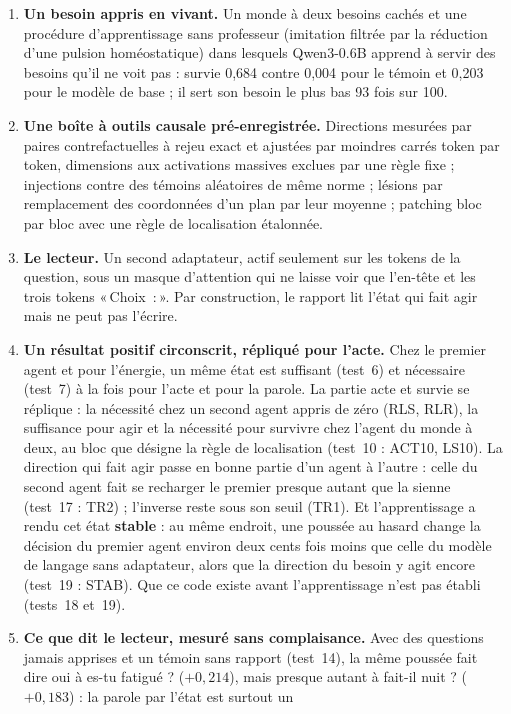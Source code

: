 \documentclass[11pt,a4paper]{article}
\newcommand{\Choix}{«\,Choix~:\,»}
\begin{document}
\begin{enumerate}
\item \textbf{Un besoin appris en vivant.} Un monde à deux besoins cachés et une
procédure d'apprentissage sans professeur (imitation filtrée par la réduction
d'une pulsion homéostatique) dans lesquels Qwen3-0.6B apprend à servir des besoins
qu'il ne voit pas : survie 0,684 contre 0,004 pour le témoin et 0,203 pour le
modèle de base ; il sert son besoin le plus bas 93 fois sur 100.
\item \textbf{Une boîte à outils causale pré-enregistrée.} Directions mesurées par
paires contrefactuelles à rejeu exact et ajustées par moindres carrés token par
token, dimensions aux activations massives exclues par une règle fixe ;
injections contre des témoins aléatoires de même norme ; lésions par
remplacement des coordonnées d'un plan par leur moyenne ; patching bloc par bloc
avec une règle de localisation étalonnée.
\item \textbf{Le lecteur.} Un second adaptateur, actif seulement sur les tokens de
la question, sous un masque d'attention qui ne laisse voir que l'en-tête et les
trois tokens \Choix{}. Par construction, le rapport lit l'état qui fait agir mais
ne peut pas l'écrire.
\item \textbf{Un résultat positif circonscrit, répliqué pour l'acte.} Chez le
premier agent et pour l'énergie, un même état est suffisant (test~6) et nécessaire
(test~7) à la fois pour l'acte et pour la parole. La partie acte et survie se
réplique : la nécessité chez un second agent appris de zéro (RLS, RLR), la
suffisance pour agir et la nécessité pour survivre chez l'agent du monde à deux,
au bloc que désigne la règle de localisation (test~10 : ACT10, LS10). La direction qui
fait agir passe en bonne partie d'un agent à l'autre : celle du second agent fait se
recharger le premier presque autant que la sienne (test~17 : TR2) ; l'inverse reste sous
son seuil (TR1). Et l'apprentissage a rendu cet état \textbf{stable} : au même endroit, une
poussée au hasard change la décision du premier agent environ deux cents fois moins que celle du
modèle de langage sans adaptateur, alors que la direction du besoin y agit encore (test~19 :
STAB). Que ce code existe avant l'apprentissage n'est pas établi (tests~18 et~19).
\item \textbf{Ce que dit le lecteur, mesuré sans complaisance.} Avec des questions
jamais apprises et un témoin sans rapport (test~14), la même poussée fait dire
\og oui \fg{} à \og es-tu fatigué ? \fg{} ($+0,214$), mais presque autant à
\og fait-il nuit ? \fg{} ($+0,183$) : la parole par l'état est surtout un

\end{enumerate}
\end{document}
